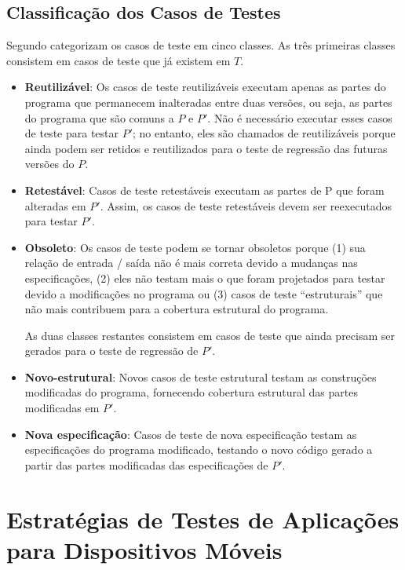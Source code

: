 \subsection{Classificação dos Casos de Testes}


Segundo \cite{Yoo:2012:RTM:2284811.2284813} categorizam os casos de teste em cinco classes. As três primeiras classes consistem em casos de teste que já existem em $T$.

\begin{itemize}
  \item \textbf{Reutilizável}: Os casos de teste reutilizáveis executam apenas as partes do programa que permanecem inalteradas entre duas versões, ou seja, as partes do programa que são comuns a $P$ e $P'$. Não é necessário executar esses casos de teste para testar $P'$; no entanto, eles são chamados de reutilizáveis porque ainda podem ser retidos e reutilizados para o teste de regressão das futuras versões do $P$.
  \item \textbf{Retestável}: Casos de teste retestáveis executam as partes de P que foram alteradas em $P'$. Assim, os casos de teste retestáveis devem ser reexecutados para testar $P'$.
  \item \textbf{Obsoleto}: Os casos de teste podem se tornar obsoletos porque (1) sua relação de entrada / saída não é mais correta devido a mudanças nas especificações, (2) eles não testam mais o que foram projetados para testar devido a modificações no programa ou (3) casos de teste ``estruturais'' que não mais contribuem para a cobertura estrutural do programa.

As duas classes restantes consistem em casos de teste que ainda precisam ser gerados para o teste de regressão de $P'$.

\item \textbf{Novo-estrutural}: Novos casos de teste estrutural testam as construções modificadas do programa, fornecendo cobertura estrutural das partes modificadas em $P'$.


\item \textbf{Nova especificação}: Casos de teste de nova especificação testam as especificações do programa modificado, testando o novo código gerado a partir das partes modificadas das especificações de $P'$.
\end{itemize}
 


\section{Estratégias de Testes de Aplicações para Dispositivos Móveis}\label{sec:testemobile}

